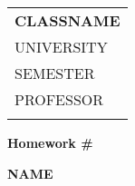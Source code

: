 \documentclass[10pt]{article}
\begin{document}

\thispagestyle{empty}

\begin{tabular}{p{15.5cm}}
  {\large \bf CLASSNAME} \\ UNIVERSITY \\ SEMESTER \\ PROFESSOR \\ \hline \\
\end{tabular}

\vspace{3mm}

\begin{center}
  {\Large \bf Homework \#}
  \vspace{2mm}

  {\bf NAME}
\end{center}

\vspace{4mm}
\end{document}
